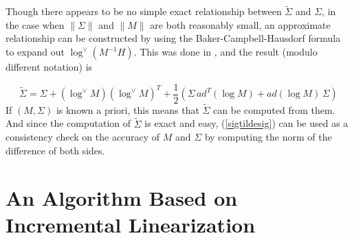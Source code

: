 \documentclass[twocolumn,10pt]{asme2ej}
\newcommand{\half}{\frac{1}{2}}
\begin{document}
Though there appears to be no simple exact relationship between $\tilde{\Sigma}$ and ${\Sigma}$, in the case when $\|\Sigma\|$ and $\|M\|$ are both reasonably
small, an approximate relationship can be constructed by using the Baker-Campbell-Hausdorf formula to expand out $\log^{\vee}(M^{-1} H)$. 
This was done in \cite{wang08}, and the result (modulo different notation) is

\begin{equation}
\tilde{\Sigma} = \Sigma + (\log^{\vee} M)(\log^{\vee} M)^T + \half \left(\Sigma \, ad^T(\log M) + ad(\log M) \, \Sigma\right)
\label{sigtildesig}
\end{equation}
If $(M,{\Sigma})$ is known a priori, this means that $\tilde{\Sigma}$ can be computed from them. 
And since the computation of $\tilde{\Sigma}$ is exact and easy, (\ref{sigtildesig}) can be used as a consistency
check on the accuracy of $M$ and $\Sigma$ by computing the norm of the difference of both sides.

\section{An Algorithm Based on Incremental Linearization}
\end{document}

